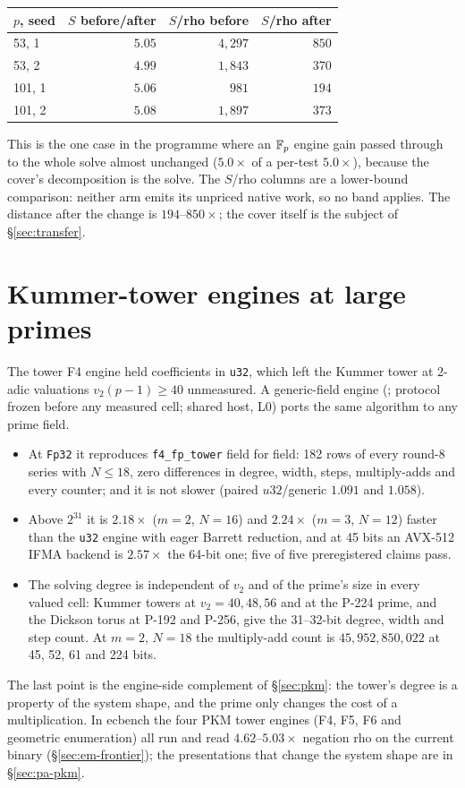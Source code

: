 \smallskip
\begin{center}\small
\begin{tabular}{@{}lrrr@{}}
\toprule
$p$, seed & $S$ before/after & $S$/rho before & $S$/rho after \\
\midrule
53, 1 & $5.05$ & $4{,}297$ & $850$ \\
53, 2 & $4.99$ & $1{,}843$ & $370$ \\
101, 1 & $5.06$ & $981$ & $194$ \\
101, 2 & $5.08$ & $1{,}897$ & $373$ \\
\bottomrule
\end{tabular}
\end{center}
\smallskip

\noindent This is the one case in the programme where an $\mathbb{F}_p$ engine gain
passed through to the whole solve almost unchanged ($5.0\times$ of a
per-test $5.0\times$), because the cover's decomposition is the solve. The
$S$/rho columns are a lower-bound comparison: neither arm emits its unpriced
native work, so no band applies. The distance after the change is
$194$--$850\times$; the cover itself is the subject of \S\ref{sec:transfer}.

\section{Kummer-tower engines at large primes}\label{sec:fe-pkm}

The tower F4 engine held coefficients in \texttt{u32}, which left the
Kummer tower at 2-adic valuations $v_2(p-1)\ge40$ unmeasured. A generic-field
engine (; protocol frozen
before any measured cell; shared host, L0) ports the same algorithm to any
prime field.
\begin{itemize}
\item At \texttt{Fp32} it reproduces \texttt{f4\_fp\_tower} field for field:
  182 rows of every round-8 series with $N\le18$, zero differences in degree,
  width, steps, multiply-adds and every counter; and it is not slower
  (paired $u32$/generic $1.091$ and $1.058$).
\item Above $2^{31}$ it is $2.18\times$ ($m=2$, $N=16$) and $2.24\times$
  ($m=3$, $N=12$) faster than the \texttt{u32} engine with eager Barrett
  reduction, and at 45 bits an AVX-512 IFMA backend is $2.57\times$ the
  64-bit one; five of five preregistered claims pass.
\item The solving degree is independent of $v_2$ and of the prime's size in
  every valued cell: Kummer towers at $v_2=40,48,56$ and at the P-224
  prime, and the Dickson torus at P-192 and P-256, give the 31--32-bit
  degree, width and step count. At $m=2$, $N=18$ the multiply-add count is
  $45{,}952{,}850{,}022$ at 45, 52, 61 and 224 bits.
\end{itemize}
The last point is the engine-side complement of \S\ref{sec:pkm}: the
tower's degree is a property of the system shape, and the prime only
changes the cost of a multiplication. In ecbench the four PKM tower engines
(F4, F5, F6 and geometric enumeration) all run and read $4.62$--$5.03\times$
negation rho on the current binary (\S\ref{sec:em-frontier}); the
presentations that change the system shape are in \S\ref{sec:pa-pkm}.

